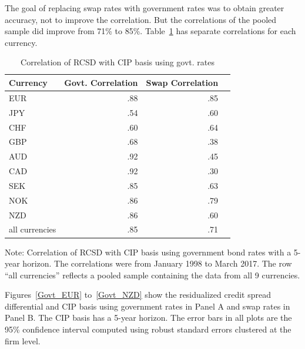 The goal of replacing swap rates with government rates was to obtain greater accuracy, not to improve the correlation.  But the correlations of the pooled sample did improve from 71\% to 85\%.   Table~\ref{govt_correl_table} has separate correlations for each currency.  


\begin{table}[h]
\caption{\label{govt_correl_table} Correlation of RCSD with CIP basis using govt. rates}
\centering
\begin{tabular}{ |l|r|r|r| }
\hline
Currency & Govt. Correlation & Swap Correlation \\
\hline
EUR & .88 & .85 \\
JPY & .54 & .60 \\
CHF & .60 & .64 \\
GBP & .68 & .38 \\
AUD & .92 & .45 \\
CAD & .92 & .30 \\
SEK & .85 & .63 \\
NOK & .86 & .79 \\
NZD & .86 & .60 \\
all currencies & .85 & .71 \\ 
\hline
\end{tabular}

\raggedright 
 Note: {\small Correlation of RCSD with CIP basis using government bond rates with a 5-year horizon.  The correlations were from January 1998 to March 2017.  The row ``all currencies'' reflects a pooled sample containing the data from all 9 currencies.  }
\end{table}


Figures~\ref{Govt_EUR} to~\ref{Govt_NZD} show the residualized credit spread differential and CIP basis using government rates in Panel A and swap rates in Panel B.  The CIP basis has a 5-year horizon.  The error bars in all plots are the 95\% confidence interval computed using robust standard errors clustered at the firm level.


